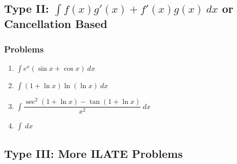 \documentclass[12pt,a4paper,twoside]{book}
\newcommand{\dint}[1]{\displaystyle{\int #1 \  dx}}
\begin{document}
	\subsection{Type II: $\dint{f(x)g'(x)+f'(x)g(x)}$ or Cancellation Based}
	
	\subsubsection{Problems}
	\begin{multicols}{2}
	\begin{enumerate}
	\item $\dint{e^x (\sin x+ \cos x)}$
	\item $\dint{(1+\ln x)\ln{(\ln x)}}$
	\item $\dint{\dfrac{\sec^2{(1+\ln x)}-\tan{(1+\ln x)}}{x^2}}$
	\item $\dint{}$
	\end{enumerate}
	\end{multicols}
	
	
	\subsection{Type III: More ILATE Problems}
\end{document}
